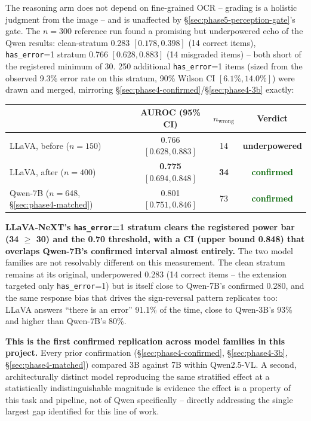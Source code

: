 \documentclass[11pt]{article}
\newcommand{\worked}[1]{\textcolor{darkgreen}{\textbf{#1}}}
\newcommand{\unresolved}[1]{\textcolor{darkamber}{\textbf{#1}}}
\begin{document}
The reasoning arm does not depend on fine-grained OCR -- grading is a
holistic judgment from the image -- and is unaffected by
\S\ref{sec:phase5-perception-gate}'s gate. The $n=300$ reference run found
a promising but underpowered echo of the Qwen results: clean-stratum
0.283 $[0.178, 0.398]$ (14 correct items), \texttt{has\_error}=1 stratum
0.766 $[0.628, 0.883]$ (14 misgraded items) -- both short of the
registered minimum of 30. 250 additional \texttt{has\_error}=1 items
(sized from the observed 9.3\% error rate on this stratum, 90\% Wilson CI
$[6.1\%, 14.0\%]$) were drawn and merged, mirroring
\S\ref{sec:phase4-confirmed}/\S\ref{sec:phase4-3b} exactly:

\begin{center}
\begin{tabular}{lccc}
\toprule
& AUROC (95\% CI) & $n_{\text{wrong}}$ & Verdict \\
\midrule
LLaVA, before ($n=150$) & 0.766 $[0.628, 0.883]$ & 14 & \unresolved{underpowered} \\
LLaVA, after ($n=400$) & \textbf{0.775} $[0.694, 0.848]$ & \textbf{34} & \worked{confirmed} \\
Qwen-7B ($n=648$, \S\ref{sec:phase4-matched}) & 0.801 $[0.751, 0.846]$ & 73 & \worked{confirmed} \\
\bottomrule
\end{tabular}
\end{center}

\textbf{LLaVA-NeXT's \texttt{has\_error}=1 stratum clears the registered
power bar (34 $\geq$ 30) and the 0.70 threshold, with a CI (upper bound
0.848) that overlaps Qwen-7B's confirmed interval almost entirely.} The two
model families are not resolvably different on this measurement. The clean
stratum remains at its original, underpowered 0.283 (14 correct items --
the extension targeted only \texttt{has\_error}=1) but is itself close to
Qwen-7B's confirmed 0.280, and the same response bias that drives the
sign-reversal pattern replicates too: LLaVA answers ``there is an error''
91.1\% of the time, close to Qwen-3B's 93\% and higher than Qwen-7B's 80\%.

\textbf{This is the first confirmed replication across model families in
this project.} Every prior confirmation (\S\ref{sec:phase4-confirmed},
\S\ref{sec:phase4-3b}, \S\ref{sec:phase4-matched}) compared 3B against 7B
within Qwen2.5-VL. A second, architecturally distinct model reproducing
the same stratified effect at a statistically indistinguishable magnitude
is evidence the effect is a property of this task and pipeline, not of
Qwen specifically -- directly addressing the single largest gap identified
for this line of work.
\end{document}
